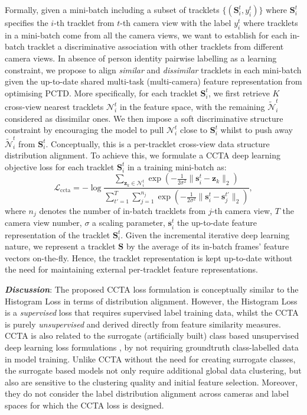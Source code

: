 \documentclass[runningheads]{llncs}
\begin{document}
Formally, given a mini-batch including a subset of tracklets
$\{(\bm{S}_i^t, y_i^t)\}$ where $\bm{S}_i^t$ specifies
the $i$-th tracklet from $t$-th camera view with
the label $y_i^t$ where tracklets in a mini-batch come from all the
camera views,
we want to establish for each in-batch tracklet a discriminative
association with other tracklets from different camera views.
In absence of person identity pairwise labelling as a learning constraint,
we propose to align {\em similar} and {\em dissimilar} tracklets in each
mini-batch given the up-to-date shared multi-task (multi-camera)
feature representation from optimising PCTD.
More specifically,
for each tracklet $\bm{S}_i^t$, 
we first retrieve $K$ cross-view nearest tracklets $\mathcal{N}_i^t$
in the feature space,
with the remaining $\tilde{\mathcal{N}}_i^t$
considered as dissimilar ones.
We then impose a soft discriminative structure constraint
by encouraging the model to pull $\mathcal{N}_i^t$
close to $\bm{S}_i^t$ whilst 
to push away $\tilde{\mathcal{N}}_i^t$ from $\bm{S}_i^t$.
Conceptually, this is a per-tracklet cross-view
data structure distribution alignment.
To achieve this, 
we formulate a CCTA deep learning objective loss for each tracklet $\bm{S}_i^t$ in a training mini-batch as:
\begin{equation}\label{eq:CCTA}
\mathcal{L}_\text{ccta}
=
-\log \frac
{\sum_{\bm{z}_k\in \mathcal{N}_i^t}\exp({-\frac{1}{2\sigma^2}\parallel \bm{s}^{t}_{i} - \bm{z}_k \parallel_{2}})}
{\sum_{t'=1}^T \sum_{j=1}^{n_j} \exp({-\frac{1}{2\sigma^2}\parallel \bm{s}^{t}_{i} - \bm{s}_{j}^{t'} \parallel_{2}})}, 
\end{equation}
where $n_j$ denotes the number of in-batch tracklets from $j$-th camera view,
$T$ the camera view number, 
$\sigma$ a scaling parameter, 
$\bm{s}_i^t$ the up-to-date feature representation of the tracklet $\bm{S}_i^t$.
Given the incremental iterative deep learning nature,
we represent a tracklet $\bm{S}$ by
the average of its in-batch frames' feature vectors
on-the-fly.
Hence, the tracklet representation is kept up-to-date 
without the need for maintaining external per-tracklet feature representations.

\textbf{\em Discussion}:
The proposed CCTA loss formulation is conceptually 
similar to the Histogram Loss \cite{Ustinova2016hist}
in terms of distribution alignment.
However, the Histogram Loss is a {\em supervised} loss that requires
supervised label training data,
whilst the CCTA is purely {\em unsupervised} 
and derived directly from feature similarity measures. 
CCTA is also related to the surrogate (artificially built)
class based unsupervised deep learning loss formulations
\cite{bautista2017deep,bautista2016cliquecnn},
by not requiring groundtruth class-labelled data in model training.
Unlike CCTA without the need for creating surrogate classes, 
the surrogate based models not only require additional global data clustering,
but also are sensitive to the clustering quality and initial feature selection.
Moreover, they do not consider the label distribution alignment 
across cameras and label spaces for which
the CCTA loss is designed.
\end{document}
